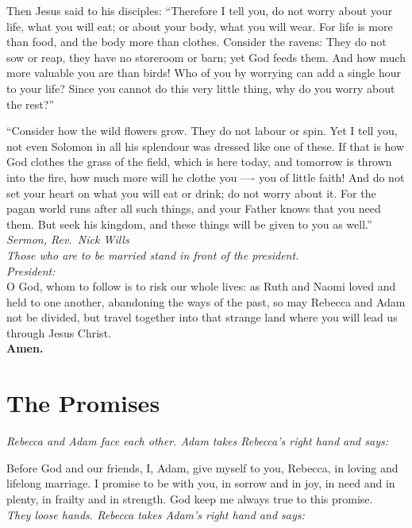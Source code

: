 \documentclass[a4paper,12pt,titlepage]{article}
\begin{document}
Then Jesus said to his disciples: ``Therefore I tell you, do not worry about your life, what you will eat; or about your body, what you will wear. For life is more than food, and the body more than clothes. Consider the ravens: They do not sow or reap, they have no storeroom or barn; yet God feeds them. And how much more valuable you are than birds! Who of you by worrying can add a single hour to your life? Since you cannot do this very little thing, why do you worry about the rest?''

``Consider how the wild flowers grow. They do not labour or spin. Yet I tell you, not even Solomon in all his splendour was dressed like one of these. If that is how God clothes the grass of the field, which is here today, and tomorrow is thrown into the fire, how much more will he clothe you —- you of little faith! And do not set your heart on what you will eat or drink; do not worry about it. For the pagan world runs after all such things, and your Father knows that you need them. But seek his kingdom, and these things will be given to you as well.''\\

{\em Sermon, Rev.~Nick Wills}\\

{\em Those who are to be married stand in front of the president.}\\

{\em President:}\\ O God, whom to follow is to risk our whole lives: as Ruth and Naomi loved and held to one another, abandoning the ways of the past, so may Rebecca and Adam not be divided, but travel together into that strange land where you will lead us through Jesus Christ.\\

{\bf Amen.}

\clearpage
\section{The Promises}

{\em Rebecca and Adam face each other. Adam takes Rebecca's right hand and says:}

Before God and our friends, I, Adam, give myself to you, Rebecca, in loving and lifelong marriage. I promise to be with you, in sorrow and in joy, in need and in plenty, in frailty and in strength. God keep me always true to this promise.\\

{\em They loose hands. Rebecca takes Adam's right hand and says:}
\end{document}
